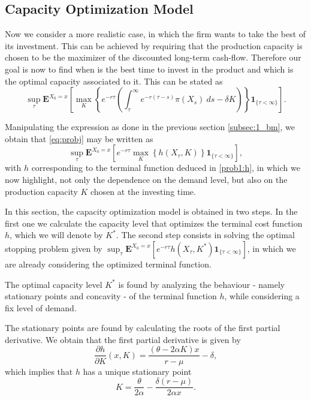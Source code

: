 

\subsection{Capacity Optimization Model}
\label{subsec:1_com}

Now we consider a more realistic case, in which the firm wants to take the best of its investment. This can be achieved by requiring that the production capacity is chosen to be the maximizer of the discounted long-term cash-flow. Therefore our goal is now to find when is the best time to invest in the product and which is the optimal capacity associated to it. This can be stated as
\begin{equation}
\sup_\tau \textbf{E}^{X_0=x} \left[ \max_K \left\{ e^{-r\tau }  \left( \int_\tau^\infty e^{-r(\tau-s)} \pi(X_s)\ ds -\delta K \right) \right\} \textbf{1}_{\{\tau<\infty\}} \right].
\label{eq:probj}
\end{equation}

Manipulating the expression as done in the previous section \ref{subsec:1_bm}, we obtain that \eqref{eq:probj} may be written as
\begin{equation}
\sup_\tau \textbf{E}^{X_0=x} \left[ e^{-r\tau } \max_K \left\{ h(X_\tau,K) \right\} \textbf{1}_{\{\tau<\infty\}} \right],
\label{eq:q1}
\end{equation}
with $h$ corresponding to the terminal function deduced in \eqref{prob1:h}, in which we now highlight, not only the dependence on the demand level, but also on the production capacity $K$ chosen at the investing time.

In this section, the capacity optimization model is obtained in two steps. In the first one we calculate the capacity level that optimizes the terminal cost function $h$, which we will denote by $K^*$. The second step consists in solving the optimal stopping problem given by $\sup_\tau \textbf{E}^{X_0=x}\left[e^{-r\tau}h(X_\tau,K^*) \textbf{1}_{\{\tau<\infty\}} \right]$, in which we are already considering the optimized terminal function.

The optimal capacity level $K^*$ is found by analyzing the behaviour - namely stationary points and concavity  - of the terminal function $h$, while considering a fix level of demand.

The stationary points are found by calculating the roots of the first partial derivative.
We obtain that the  first partial derivative is given by
$$\frac{\partial h }{\partial K}(x,K)=  \frac{(\theta-2\alpha K)x}{r-\mu} - \delta, $$
which implies that $h$ has a unique stationary point
\begin{equation}
K=\frac{\theta}{2\alpha}-\frac{\delta (r-\mu)}{2 \alpha x}. 
\label{eq:K41}
\end{equation}

